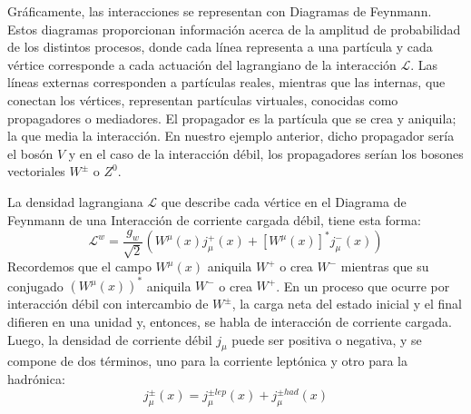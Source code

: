 Gráficamente, las interacciones se representan con Diagramas de Feynmann. Estos diagramas proporcionan información acerca de la amplitud de probabilidad de los distintos procesos, donde cada línea representa a una partícula y cada vértice corresponde a cada actuación del lagrangiano de la interacción $\mathcal{L}$. Las líneas externas corresponden a partículas reales, mientras que las internas, que conectan los vértices, representan partículas virtuales, conocidas como propagadores o mediadores. El propagador es la partícula que se crea y aniquila; la que media la interacción. \cite{notas2020} En nuestro ejemplo anterior, dicho propagador sería el bosón $V$  y en el caso de la interacción débil, los propagadores serían los bosones vectoriales $W^{\pm}$ o $Z^0$.

La densidad lagrangiana $\mathcal{L}$ que describe cada vértice en el Diagrama de Feynmann de una Interacción de corriente cargada débil, tiene esta forma:
\begin{equation}
\mathcal{L}^{w}=\dfrac{g_{w}}{\sqrt{2}}\left( W^{\mu }\left( x\right) j_{\mu}^{+}\left( x\right) +\left[ W^{\mu }\left( x\right) \right]^{\ast }j_{\mu}^{-}\left( x\right) \right)\label{eq:weak_lagrangian}
\end{equation}
Recordemos que el campo $W^{\mu}(x)$ aniquila $W^{+}$ o crea $W^{-}$ mientras que su conjugado $\left(W^{\mu}(x)\right)^\ast$ aniquila $W^{-}$ o crea $W^{+}$. En un proceso que ocurre por interacción débil con intercambio de $W^{\pm}$, la carga neta del estado inicial y el final difieren en una unidad y, entonces, se habla de interacción de corriente cargada. Luego, la densidad de corriente débil $j_{\mu}$ puede ser positiva o negativa, y se compone de dos términos, uno para la corriente leptónica y otro para la hadrónica:
\begin{equation}
j_{\mu} ^{\pm }\left( x\right) =j_{\mu} ^{\pm lep}\left( x\right) +j_{\mu} ^{\pm had}\left( x\right) \label{eq:weak_current_hadylep}
\end{equation}


